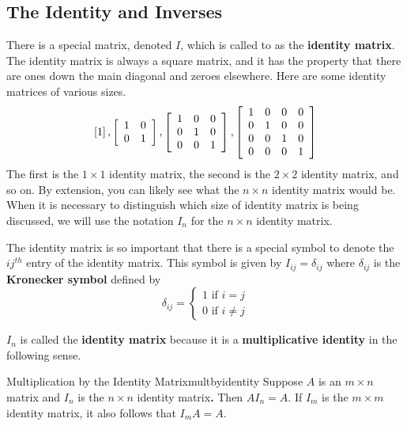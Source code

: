\subsection{The Identity and Inverses}

There is a special matrix, denoted $I$, which is called
 to as the \textbf{identity matrix}. The identity matrix is always a square
matrix, and it has
the property that there are ones down the main diagonal and zeroes
elsewhere. Here are some identity matrices of various sizes.
\begin{equation*}
\left[ 1\right] ,\left[
\begin{array}{cc}
1 & 0 \\
0 & 1
\end{array}
\right] ,\left[
\begin{array}{ccc}
1 & 0 & 0 \\
0 & 1 & 0 \\
0 & 0 & 1
\end{array}
\right] ,\left[
\begin{array}{cccc}
1 & 0 & 0 & 0 \\
0 & 1 & 0 & 0 \\
0 & 0 & 1 & 0 \\
0 & 0 & 0 & 1
\end{array}
\right] 
\end{equation*}
The first is the $1\times 1$ identity matrix, the second is the $2\times 2$
identity matrix, and so on. By extension, you can likely see
what the $n\times n$ identity matrix would be. When it is necessary to distinguish 
which size of identity matrix is being discussed, we will use the 
notation $I_n$ for the $n \times n$ identity matrix. 

The identity matrix is so important that there
is a special symbol to denote the $ij^{th}$ entry of the identity matrix. This symbol is given by 
$I_{ij}=\delta _{ij}$ where $\delta _{ij}$ is the \textbf{Kronecker symbol}
defined
 by
\begin{equation*}
\delta _{ij}=\left\{
\begin{array}{c}
1
\text{ if }i=j \\
0\text{ if }i\neq j
\end{array}
\right.
\end{equation*}

$I_n$ is called the \textbf{identity matrix} because it is a \textbf{multiplicative identity} in the following sense.

\begin{lemma}{Multiplication by the Identity Matrix}{multbyidentity}
Suppose $A$ is an $m\times n$ matrix and $I_{n}$ is the $n\times n$ identity
matrix\textbf{.} Then $AI_{n}=A.$ If $I_{m}$ is the $m\times m$ identity
matrix, it also follows that $I_{m}A=A.$
\end{lemma}

